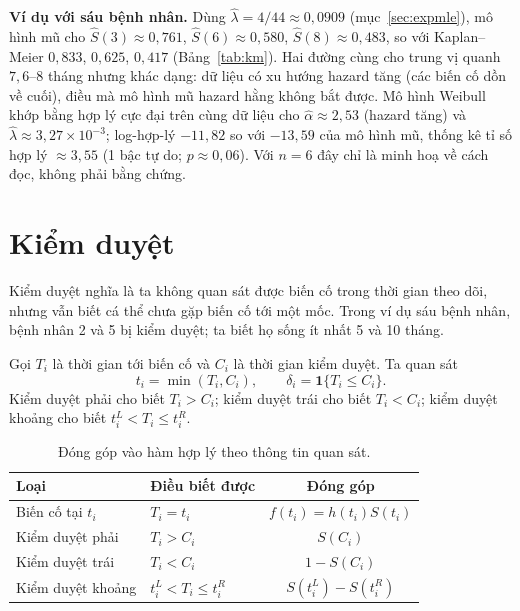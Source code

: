 \documentclass[11pt,a4paper,notitlepage]{report}
\newcommand{\ind}{\mathbf{1}}
\begin{document}
\textbf{Ví dụ với sáu bệnh nhân.} Dùng $\hat\lambda=4/44\approx0{,}0909$ (mục~\ref{sec:expmle}), mô hình mũ cho
$\hat S(3)\approx0{,}761$, $\hat S(6)\approx0{,}580$, $\hat S(8)\approx0{,}483$, so với Kaplan--Meier $0{,}833$, $0{,}625$, $0{,}417$ (Bảng~\ref{tab:km}).
Hai đường cùng cho trung vị quanh $7{,}6$--$8$ tháng nhưng khác dạng: dữ liệu có xu hướng hazard tăng (các biến cố dồn về cuối),
điều mà mô hình mũ hazard hằng không bắt được. Mô hình Weibull khớp bằng hợp lý cực đại trên cùng dữ liệu cho $\hat\alpha\approx2{,}53$ (hazard tăng) và
$\hat\lambda\approx3{,}27\times10^{-3}$; log-hợp-lý $-11{,}82$ so với $-13{,}59$ của mô hình mũ, thống kê tỉ số hợp lý $\approx3{,}55$ (1 bậc tự do; $p\approx0{,}06$). Với $n=6$ đây chỉ là minh hoạ về cách đọc,
không phải bằng chứng.


\section{Kiểm duyệt}\label{sec:kiemduyet}

Kiểm duyệt nghĩa là ta không quan sát được biến cố trong thời gian theo dõi, nhưng vẫn biết cá
thể chưa gặp biến cố tới một mốc. Trong ví dụ sáu bệnh nhân, bệnh nhân 2 và 5 bị kiểm duyệt;
ta biết họ sống ít nhất 5 và 10 tháng.

Gọi $T_i$ là thời gian tới biến cố và $C_i$ là thời gian kiểm duyệt. Ta quan sát
\begin{equation}
t_i=\min(T_i,C_i),\qquad\delta_i=\ind\{T_i\le C_i\}.
\end{equation}
Kiểm duyệt phải cho biết $T_i>C_i$; kiểm duyệt trái cho biết $T_i<C_i$; kiểm duyệt khoảng cho biết
$t_i^L<T_i\le t_i^R$.

\begin{table}[H]\centering
\caption{Đóng góp vào hàm hợp lý theo thông tin quan sát.}
\begin{tabular}{llc}
\toprule
Loại & Điều biết được & Đóng góp\\
\midrule
Biến cố tại $t_i$ & $T_i=t_i$ & $f(t_i)=h(t_i)S(t_i)$\\
Kiểm duyệt phải & $T_i>C_i$ & $S(C_i)$\\
Kiểm duyệt trái & $T_i<C_i$ & $1-S(C_i)$\\
Kiểm duyệt khoảng & $t_i^L<T_i\le t_i^R$ & $S(t_i^L)-S(t_i^R)$\\
\bottomrule
\end{tabular}
\end{table}
\end{document}
